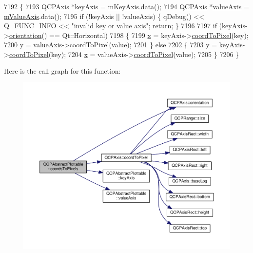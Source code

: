 \begin{DoxyCode}
7192 \{
7193   \hyperlink{class_q_c_p_axis}{QCPAxis} *\hyperlink{class_q_c_p_abstract_plottable_a72c7a09c22963f2c943f07112b311103}{keyAxis} = \hyperlink{class_q_c_p_abstract_plottable_a426f42e254d0f8ce5436a868c61a6827}{mKeyAxis}.data();
7194   \hyperlink{class_q_c_p_axis}{QCPAxis} *\hyperlink{class_q_c_p_abstract_plottable_a3106f9d34d330a6097a8ec5905e5b519}{valueAxis} = \hyperlink{class_q_c_p_abstract_plottable_a2901452ca4aea911a1827717934a4bda}{mValueAxis}.data();
7195   \textcolor{keywordflow}{if} (!keyAxis || !valueAxis) \{ qDebug() << Q\_FUNC\_INFO << \textcolor{stringliteral}{"invalid key or value axis"}; \textcolor{keywordflow}{return}; \}
7196   
7197   \textcolor{keywordflow}{if} (keyAxis->\hyperlink{class_q_c_p_axis_a57483f2f60145ddc9e63f3af53959265}{orientation}() == Qt::Horizontal)
7198   \{
7199     \hyperlink{_comparision_pictures_2_createtest_image_8m_a9336ebf25087d91c818ee6e9ec29f8c1}{x} = keyAxis->\hyperlink{class_q_c_p_axis_a985ae693b842fb0422b4390fe36d299a}{coordToPixel}(key);
7200     \hyperlink{_comparision_pictures_2_createtest_image_8m_a2fb1c5cf58867b5bbc9a1b145a86f3a0}{y} = valueAxis->\hyperlink{class_q_c_p_axis_a985ae693b842fb0422b4390fe36d299a}{coordToPixel}(value);
7201   \} \textcolor{keywordflow}{else}
7202   \{
7203     \hyperlink{_comparision_pictures_2_createtest_image_8m_a2fb1c5cf58867b5bbc9a1b145a86f3a0}{y} = keyAxis->\hyperlink{class_q_c_p_axis_a985ae693b842fb0422b4390fe36d299a}{coordToPixel}(key);
7204     \hyperlink{_comparision_pictures_2_createtest_image_8m_a9336ebf25087d91c818ee6e9ec29f8c1}{x} = valueAxis->\hyperlink{class_q_c_p_axis_a985ae693b842fb0422b4390fe36d299a}{coordToPixel}(value);
7205   \}
7206 \}
\end{DoxyCode}


Here is the call graph for this function\+:\nopagebreak
\begin{figure}[H]
\begin{center}
\leavevmode
\includegraphics[width=350pt]{class_q_c_p_abstract_plottable_ade710a776104b14c1c835168ce1bfc5c_cgraph}
\end{center}
\end{figure}




